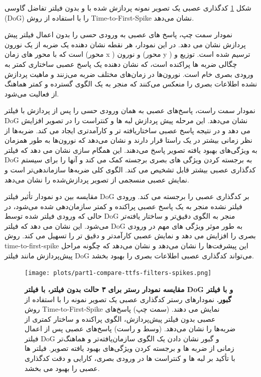         شکل 
        \ref{fig:part1-compare-ttfs-filters-spikes}
        کدگذاری عصبی یک تصویر نمونه پردازش شده با و بدون فیلتر تفاضل گاوسی 
        (DoG) 
        را با استفاده از روش
        Time-to-First-Spike
        نشان می‌دهد. 

        نمودار سمت چپ، پاسخ های عصبی به ورودی حسی را بدون اعمال فیلتر پیش پردازش نشان می دهد. در این نمودار، هر نقطه نشان دهنده یک ضربه از یک نورون است که با محور های زمان 
        (محور x )
        و 
        نورون
        (محور y ) 
        ترسیم شده است. توزیع و چگالی ضربه ها پراکنده است، که نشان دهنده یک پاسخ عصبی ساختاری کمتر به ورودی بصری خام است. نورون‌ها در زمان‌های مختلف ضربه می‌زنند و ماهیت پردازش نشده اطلاعات بصری را منعکس می‌کنند که منجر به یک الگوی گسترده و کمتر هماهنگ از فعالیت می‌شود.

        نمودار سمت راست، پاسخ‌های عصبی به همان ورودی حسی را پس از پردازش با فیلتر 
        DoG 
        نشان می‌دهد. این مرحله پیش پردازش لبه ها و کنتراست را در تصویر افزایش می دهد و در نتیجه پاسخ عصبی ساختاریافته تر و کارآمدتری ایجاد می کند. ضربه‌ها از نظر زمانی بیشتر در یک راستا قرار دارند و نشان می‌دهد که نورون‌ها به طور همزمان به ویژگی‌های بهبود یافته تصویر پاسخ می‌دهند. این همگام سازی نشان می دهد که فیلتر 
        DoG 
        به برجسته کردن ویژگی های بصری برجسته کمک می کند و آنها را برای سیستم کدگذاری عصبی بیشتر قابل تشخیص می کند. الگوی کلی ضربه‌ها سازماندهی‌تر است و نمایش عصبی منسجمی از تصویر پردازش‌شده را نشان می‌دهد.

        مقایسه بین دو نمودار تأثیر فیلتر 
        DoG 
        بر کدگذاری عصبی را برجسته می کند. ورودی فیلتر نشده منجر به یک پاسخ عصبی پراکنده و کمتر سازمان‌دهی شده می‌شود، در حالی که ورودی فیلتر شده توسط 
        DoG 
        منجر به الگوی دقیق‌تر و ساختار یافته‌تر می‌شود. این نشان می دهد که فیلتر 
        DoG 
        به طور موثر ویژگی های مهم در ورودی بصری را افزایش می دهد و نمایش عصبی کارآمدتر و دقیق تر را تسهیل می کند. روش 
        time-to-first-spike 
        این پیشرفت‌ها را نشان می‌دهد و نشان می‌دهد که چگونه مراحل پیش‌پردازش مانند فیلتر 
        DoG 
        می‌تواند کدگذاری عصبی اطلاعات بصری را بهبود بخشد.

        \begin{figure}[!ht]
            \centering
            \texttt{[image: plots/part1-compare-ttfs-filters-spikes.png]} 
            \captionsetup{width=.9\linewidth}
            \caption{\textbf{مقایسه نمودار رستر برای ۳ حالت بدون فیلتر، با فیلتر 
            DoG 
            و با فیلتر گبور.} 
            نمودارهای رستر کدگذاری عصبی یک تصویر نمونه را با استفاده از روش 
            Time-to-First-Spike
            نمایش می دهند. 
            (سمت چپ) 
            پاسخ‌های عصبی بدون فیلتر پیش‌پردازش، الگوی پراکنده و ساختار کمتری از ضربه‌ها را نشان می‌دهد. 
            (وسط و راست) 
            پاسخ‌های عصبی پس از اعمال فیلتر 
            DoG 
            و گبور نشان دادن یک الگوی سازمان‌یافته‌تر و هماهنگ‌تر زمانی از ضربه ها و برجسته کردن ویژگی‌های بهبود یافته تصویر. فیلتر ها
            با تأکید بر لبه ها و کنتراست ها در ورودی بصری، کارایی و دقت کدگذاری عصبی را بهبود می بخشد.}
            \label{fig:part1-compare-ttfs-filters-spikes}
        \end{figure}

